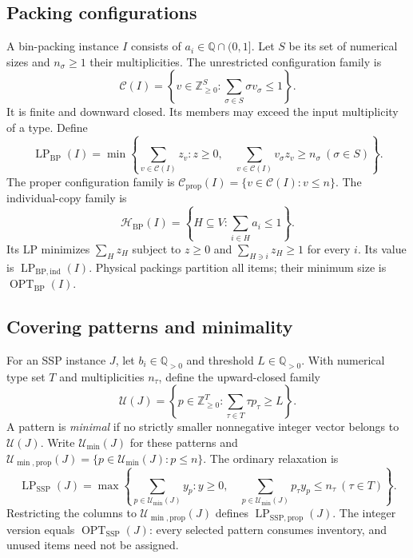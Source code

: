 \documentclass[11pt,a4paper]{article}
\theoremstyle{definition}
\theoremstyle{remark}
\newcommand{\Z}{\mathbb Z}
\newcommand{\Q}{\mathbb Q}
\newcommand{\BP}{\mathrm{BP}}
\newcommand{\SSP}{\mathrm{SSP}}
\newcommand{\OPT}{\operatorname{OPT}}
\newcommand{\LP}{\operatorname{LP}}
\newcommand{\cC}{\mathcal C}
\newcommand{\cU}{\mathcal U}
\newcommand{\cH}{\mathcal H}
\begin{document}
\subsection{Packing configurations}
A bin-packing instance $I$ consists of $a_i\in\Q\cap(0,1]$. Let $S$ be its set of numerical sizes and $n_\sigma\ge1$ their multiplicities. The unrestricted configuration family is
\[
 \cC(I)=\left\{v\in\Z_{\ge0}^{S}:\sum_{\sigma\in S}\sigma v_\sigma\le1\right\}.
\]
It is finite and downward closed. Its members may exceed the input multiplicity of a type. Define
\begin{equation}\label{eq:packing-lp}
 \LP_{\BP}(I)=\min\left\{\sum_{v\in\cC(I)}z_v:
 z\ge0,\quad \sum_{v\in\cC(I)}v_\sigma z_v\ge n_\sigma\ (\sigma\in S)\right\}.
\end{equation}
The proper configuration family is $\cC_{\mathrm{prop}}(I)=\{v\in\cC(I):v\le n\}$. The individual-copy family is
\[
 \cH_{\BP}(I)=\left\{H\subseteq V:\sum_{i\in H}a_i\le1\right\}.
\]
Its LP minimizes $\sum_H z_H$ subject to $z\ge0$ and $\sum_{H\ni i}z_H\ge1$ for every $i$. Its value is $\LP_{\BP,\mathrm{ind}}(I)$. Physical packings partition all items; their minimum size is $\OPT_{\BP}(I)$.

\subsection{Covering patterns and minimality}
For an SSP instance $J$, let $b_i\in\Q_{>0}$ and threshold $L\in\Q_{>0}$. With numerical type set $T$ and multiplicities $n_\tau$, define the upward-closed family
\[
 \cU(J)=\left\{p\in\Z_{\ge0}^{T}:\sum_{\tau\in T}\tau p_\tau\ge L\right\}.
\]
A pattern is \emph{minimal} if no strictly smaller nonnegative integer vector belongs to $\cU(J)$. Write $\cU_{\min}(J)$ for these patterns and $\cU_{\min,\mathrm{prop}}(J)=\{p\in\cU_{\min}(J):p\le n\}$. The ordinary relaxation is
\begin{equation}\label{eq:covering-lp}
 \LP_{\SSP}(J)=\max\left\{\sum_{p\in\cU_{\min}(J)}y_p:
 y\ge0,\quad \sum_{p\in\cU_{\min}(J)}p_\tau y_p\le n_\tau\ (\tau\in T)\right\}.
\end{equation}
Restricting the columns to $\cU_{\min,\mathrm{prop}}(J)$ defines $\LP_{\SSP,\mathrm{prop}}(J)$. The integer version equals $\OPT_{\SSP}(J)$: every selected pattern consumes inventory, and unused items need not be assigned.
\end{document}
